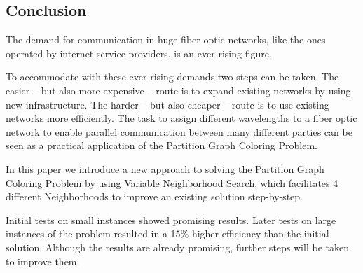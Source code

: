 \documentclass[paper=a4,fontsize=12pt]{scrartcl}
\begin{document}

\subsection{Conclusion}
The demand for communication in huge fiber optic networks, like the ones operated by internet service providers, is an ever rising figure.


To accommodate with these ever rising demands two steps can be taken. The easier -- but also more expensive -- route is to expand existing networks by using new infrastructure. The harder -- but also cheaper -- route is to use existing networks more efficiently. The task to assign different wavelengths to a fiber optic network to enable parallel communication between many different parties can be seen as a practical application of the Partition Graph Coloring Problem. 


In this paper we introduce a new approach to solving the Partition Graph Coloring Problem by using Variable Neighborhood Search, which facilitates 4 different Neighborhoods to improve an existing solution step-by-step.


Initial tests on small instances showed promising results. Later tests on large instances of the problem resulted in a 15\% higher efficiency than the initial solution. Although the results are already promising, further steps will be taken to improve them.

\end{document}
